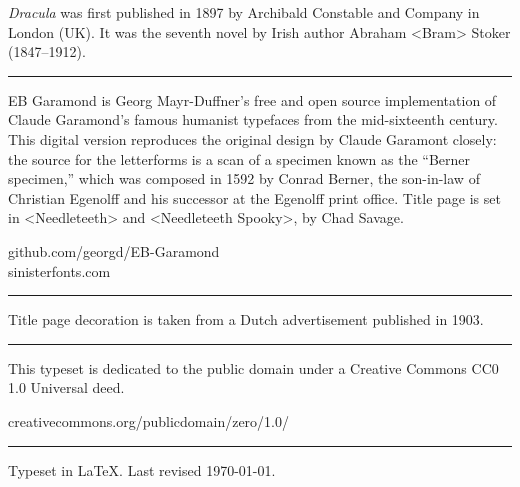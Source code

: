 \documentclass[
a5paper,
]{scrbook}
\begin{document}
\centering
\begin{minipage}{\textwidth}
\textit{Dracula} was first published in 1897 by Archibald Constable and Company in London (UK). It was the seventh novel by Irish author Abraham <Bram> Stoker (1847--1912).
\end{minipage}
\vfill
\rule{0.5\textwidth}{.4pt}
\vfill
\begin{minipage}{\textwidth}
EB Garamond is Georg Mayr-Duffner's free and open source implementation of Claude Garamond’s famous humanist typefaces from the mid-sixteenth century. This digital version reproduces the original design by Claude Garamont closely: the source for the letterforms is a scan of a specimen known as the \enquote{Berner specimen,} which was composed in 1592 by Conrad Berner, the son-in-law of Christian Egenolff and his successor at the Egenolff print office. Title page is set in <Needleteeth> and <Needleteeth Spooky>, by Chad Savage.
\end{minipage}
\vfill
github.com/georgd/EB-Garamond\\
sinisterfonts.com
\vfill
\rule{0.5\textwidth}{.4pt}
\vfill

\begin{minipage}{\textwidth}
Title page decoration is taken from a Dutch advertisement published in 1903.
\end{minipage}

\vfill
\rule{0.5\textwidth}{.4pt}
\vfill

\begin{minipage}{\textwidth}
This typeset is dedicated to the public domain under a Creative Commons CC0 1.0 Universal deed.\end{minipage}
\vfill
creativecommons.org/publicdomain/zero/1.0/
\vfill
\rule{0.5\textwidth}{.4pt}
\vfill

Typeset in \LaTeX{}. Last revised \today.
\thispagestyle{empty}
\end{document}
